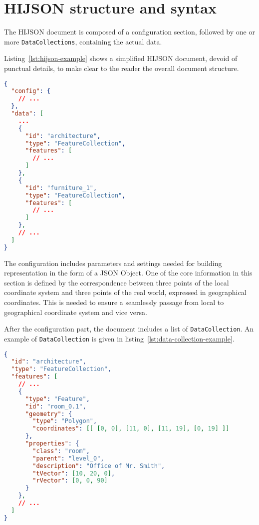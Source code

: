 
\section{HIJSON structure and syntax}\label{hijson-syntax}

The HIJSON document is composed of a configuration section, followed by one or more {\tt DataCollections}, containing the actual data.

Listing~\ref{lst:hijson-example} shows a simplified HIJSON document, devoid of punctual details, to make clear to the reader the overall document structure.


\begin{lstlisting}[language=json, label={lst:hijson-example}, captionpos=b, caption=Example of HIJSON document.]
{
  "config": {
    // ...
  },
  "data": [
    ...
    {
      "id": "architecture",
      "type": "FeatureCollection",
      "features": [
        // ...
      ] 
    },
    {
      "id": "furniture_1",
      "type": "FeatureCollection",
      "features": [
        // ...
      ] 
    },
    // ...
  ]
}
\end{lstlisting}


The configuration includes parameters and settings needed for building representation in the form of a JSON Object. One of the core information in this section is defined by the correspondence between three points of the local coordinate system and three points of the real world, expressed in geographical coordinates. This is needed to ensure a seamlessly passage from local to geographical coordinate system and vice versa.

After the configuration part, the document includes a list of {\tt DataCollection}. An example
of {\tt DataCollection} is given in listing~\ref{lst:data-collection-example}.


\begin{lstlisting}[language=json, label={lst:data-collection-example}, captionpos=b,  caption=Example of {\tt DataCollection}.]
{
  "id": "architecture",
  "type": "FeatureCollection",
  "features": [
    // ...
    {
      "type": "Feature",
      "id": "room_0.1",
      "geometry": {
        "type": "Polygon",
        "coordinates": [[ [0, 0], [11, 0], [11, 19], [0, 19] ]]
      },
      "properties": {
        "class": "room",
        "parent": "level_0",
        "description": "Office of Mr. Smith",
        "tVector": [10, 20, 0],
        "rVector": [0, 0, 90]
      }
    },
    // ...
  ]
}
\end{lstlisting}

